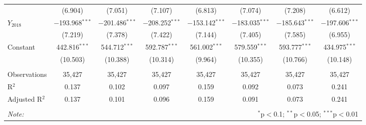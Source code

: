 \documentclass[12pt,a4paper]{article}
\begin{document}
\begin{table}[!ht]
{\begin{tabular}{lccccccc}
& (6.904) & (7.051) & (7.107) & (6.813) & (7.074) & (7.208) & (6.612) \\
$Y_{2018}$ & $-$193.968$^{***}$ & $-$201.486$^{***}$ & $-$208.252$^{***}$ & $-$153.142$^{***}$ & $-$183.035$^{***}$ & $-$185.643$^{***}$ & $-$197.606$^{***}$ \\
& (7.219) & (7.378) & (7.422) & (7.144) & (7.405) & (7.585) & (6.955) \\
Constant & 442.816$^{***}$ & 544.712$^{***}$ & 592.787$^{***}$ & 561.002$^{***}$ & 579.559$^{***}$ & 593.777$^{***}$ & 434.975$^{***}$ \\
& (10.503) & (10.388) & (10.314) & (9.964) & (10.355) & (10.766) & (10.148) \\
\hline \\[-1.8ex]
Observations & 35,427 & 35,427 & 35,427 & 35,427 & 35,427 & 35,427 & 35,427 \\
R$^{2}$ & 0.137 & 0.102 & 0.097 & 0.159 & 0.092 & 0.073 & 0.241 \\
Adjusted R$^{2}$ & 0.137 & 0.101 & 0.096 & 0.159 & 0.091 & 0.073 & 0.241 \\
\hline
\hline \\[-1.8ex]
\textit{Note:} & \multicolumn{7}{r}{$^{*}$p$<$0.1; $^{**}$p$<$0.05; $^{***}$p$<$0.01} \\
\end{tabular} }
\end{table}
\end{document}
